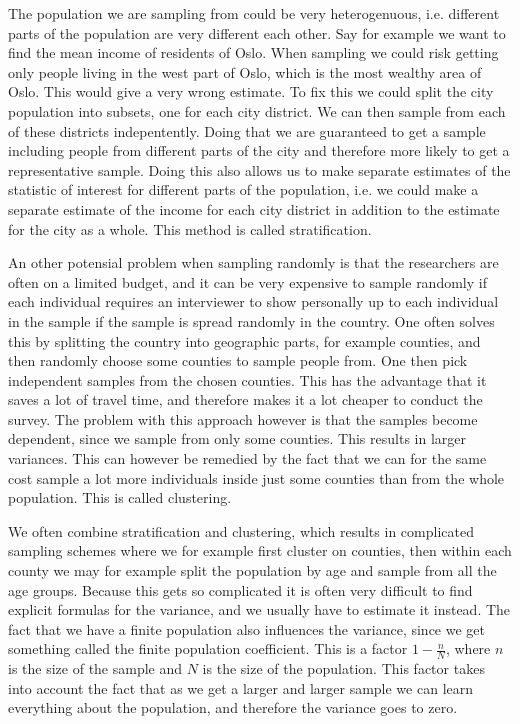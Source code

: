 \documentclass{article}
\begin{document}
The population we are sampling from could be very heterogenuous, i.e. different
parts of the population are very different each other. Say for example we want
to find the mean income of residents of Oslo. When sampling we could risk
getting only people living in the west part of Oslo, which is the most wealthy
area of Oslo. This would give a very wrong estimate. To fix this we could split
the city population into subsets, one for each city district. We can then sample
from each of these districts indepentently. Doing that we are guaranteed to get
a sample including people from different parts of the city and therefore
more likely to get a representative sample. Doing this also allows us to make
separate estimates of the statistic of interest for different parts of the
population, i.e. we could make a separate estimate of the income for each city
district in addition to the estimate for the city as a whole. This method is
called stratification.

An other potensial problem when sampling randomly is that the researchers are
often on a limited budget, and it can be very expensive to sample randomly if
each individual requires an interviewer to show personally up to each individual
in the sample if the sample is spread randomly in the country. One often solves
this by splitting the country into geographic parts, for example counties, and
then randomly choose some counties to sample people from. One then pick
independent samples from the chosen counties. This has the advantage that it
saves a lot of travel time, and therefore makes it a lot cheaper to conduct the
survey. The problem with this approach however is that the samples become
dependent, since we sample from only some counties. This results in larger
variances. This can however be remedied by the fact that we can for the same
cost sample a lot more individuals inside just some counties than from the whole
population. This is called clustering.

We often combine stratification and clustering, which results in complicated
sampling schemes where we for example first cluster on counties, then within
each county we may for example split the population by age and sample from all
the age groups. Because this gets so complicated it is often very difficult to
find explicit formulas for the variance, and we usually have to estimate it
instead. 
The fact that we have a finite population also influences the variance, since we
get something called the finite population coefficient. This is a factor \(1 -
\frac{n}{N}\), where \(n\) is the size of the sample and \(N\) is the size of
the population. This factor takes into account the fact that as we get a larger
and larger sample we can learn everything about the population, and therefore
the variance goes to zero.
\end{document}
